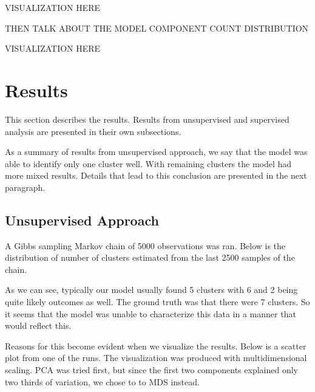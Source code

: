 \documentclass[a4paper]{article}
\begin{document}
\par
VISUALIZATION HERE

\par
THEN TALK ABOUT THE MODEL COMPONENT COUNT DISTRIBUTION

\par
VISUALIZATION HERE

\section{Results}

This section describes the results. Results from unsupervised and supervised analysis are presented in their own subsections.

As a summary of results from unsupervised approach, we say that the model was able to identify only one cluster well. With remaining clusters the model had more mixed results. Details that lead to this conclusion are presented in the next paragraph.

\subsection{Unsupervised Approach}

\par
A Gibbs sampling Markov chain of 5000 observations was ran. Below is the distribution of number of clusters estimated from the last 2500 samples of the chain.


As we can see, typically our model usually found 5 clusters with 6 and 2 being quite likely outcomes as well. The ground truth was that there were 7 clusters. So it seems that the model was unable to characterize this data in a manner that would reflect this.

Reasons for this become evident when we visualize the results. Below is a scatter plot from one of the runs. The visualization was produced with multidimensional scaling. PCA was tried first, but since the first two components explained only two thirds of variation, we chose to to MDS instead. 

\end{document}
